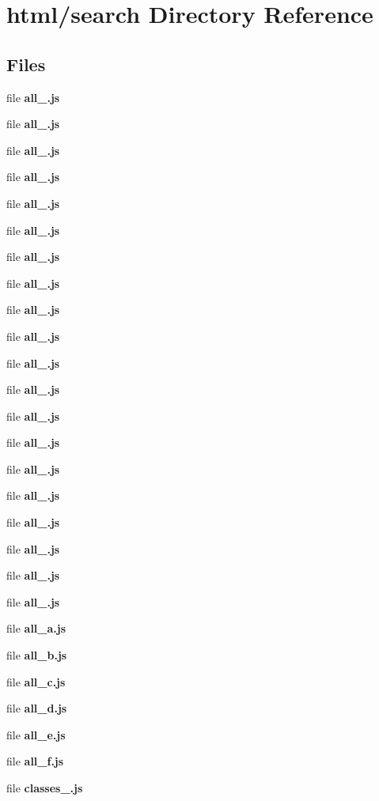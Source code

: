 \section{html/search Directory Reference}
\label{dir_ddeed1b19b98904c6aa1b48c4ffa871b}
\subsection*{Files}
\begin{DoxyCompactItemize}
\item 
file {\bf all\-\_.\-js}
\item 
file {\bf all\-\_.\-js}
\item 
file {\bf all\-\_.\-js}
\item 
file {\bf all\-\_.\-js}
\item 
file {\bf all\-\_.\-js}
\item 
file {\bf all\-\_.\-js}
\item 
file {\bf all\-\_.\-js}
\item 
file {\bf all\-\_.\-js}
\item 
file {\bf all\-\_.\-js}
\item 
file {\bf all\-\_.\-js}
\item 
file {\bf all\-\_.\-js}
\item 
file {\bf all\-\_.\-js}
\item 
file {\bf all\-\_.\-js}
\item 
file {\bf all\-\_.\-js}
\item 
file {\bf all\-\_.\-js}
\item 
file {\bf all\-\_.\-js}
\item 
file {\bf all\-\_.\-js}
\item 
file {\bf all\-\_.\-js}
\item 
file {\bf all\-\_.\-js}
\item 
file {\bf all\-\_.\-js}
\item 
file {\bf all\-\_\-a.\-js}
\item 
file {\bf all\-\_\-b.\-js}
\item 
file {\bf all\-\_\-c.\-js}
\item 
file {\bf all\-\_\-d.\-js}
\item 
file {\bf all\-\_\-e.\-js}
\item 
file {\bf all\-\_\-f.\-js}
\item 
file {\bf classes\-\_.\-js}
\item 

\end{DoxyCompactItemize}
